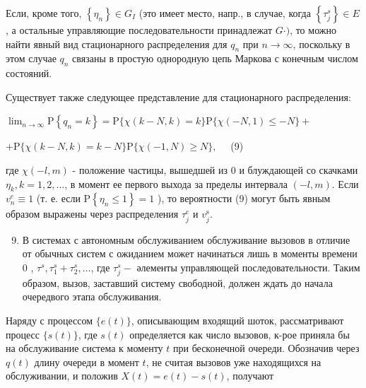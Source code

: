 \documentclass[10pt]{article}
\begin{document}
Если, кроме того, $\left\{\eta_{n}\right\} \in G_{I}$ (это имеет место, напр., в случае, когда $\left\{\tau_{j}^{s}\right\} \in E$, а остальные управляющие последовательности принадлежат $G \cdot)$, то можно найти явный вид стационарного распределения для $q_{n}$ при $n \rightarrow \infty$, поскольку в этом случае $q_{n}$ связаны в простую однородную цепь Маркова с конечным числом состояний.



Существует также следующее представление для стационарного распределения:



$\lim _{n \rightarrow \infty} \mathrm{P}\left\{q_{n}=k\right\}=\mathrm{P}\{\chi(k-N, k)=k\} \mathrm{P}\{\chi(-N, 1) \leqslant-N\}+$



$+\mathrm{P}\{\chi(k-N, k)=k-N\} \mathrm{P}\{\chi(-1, N) \geqslant N\}, \quad$ (9)



где $\chi(-l, m)$ - положение частицы, вышедшей из 0 и блуждающей со скачками $\eta_{k}, k=1,2, \ldots$, в момент ее первого выхода за пределы интервала $(-l, m)$. Если $v_{n}^{e} \equiv 1$ (т. е. если $\mathrm{P}\left\{\eta_{n} \leqslant 1\right\}=1$ ), то вероятности (9) могут быть явным образом выражены через распределения $\tau_{j}^{e}$ и $v_{j}^{\mathrm{s}}$.



\begin{enumerate}

  \setcounter{enumi}{8}

  \item В системах с автономным обслуживанием обслуживание вызовов в отличие от обычных систем с ожиданием может начинаться лишь в моменты времени 0 , $\tau^{s}, \tau_{1}^{s}+\tau_{2}^{s}, \ldots$, где $\tau_{j}^{s}-$ әлементы управляющей последовательности. Таким образом, вызов, заставший систему свободной, должен ждать до начала очередвого этапа обслуживания.

\end{enumerate}



Наряду с процессом $\{e(t)\}$, описывающим входящий шоток, рассматривают процесс $\{s(t)\}$, где $s(t)$ определяется как число вызовов, к-рое приняла бы на обслуживание система к моменту $t$ при бесконечной очереди. Обозначив через $q(t)$ длину очереди в момент $t$, не считая вызовов уже находящихся на обслуживании, и положив $X(t)=e(t)-s(t)$, получают
\end{document}
